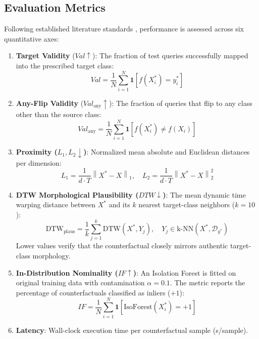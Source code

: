 \documentclass[conference]{IEEEtran}
\newcommand{\norm}[1]{\left\lVert#1\right\rVert}
\begin{document}
\subsection{Evaluation Metrics}
Following established literature standards \cite{kostrzewa2026softdtw, wachter2017counterfactual}, performance is assessed across six quantitative axes:
\begin{enumerate}
    \item \textbf{Target Validity} ($Val \uparrow$): The fraction of test queries successfully mapped into the prescribed target class:
    \begin{equation}
        Val = \frac{1}{N}\sum_{i=1}^N \mathbf{1}\left[ f(X_i^*) = y_i^* \right]
    \end{equation}
    \item \textbf{Any-Flip Validity} ($Val_{\text{any}} \uparrow$): The fraction of queries that flip to any class other than the source class:
    \begin{equation}
        Val_{\text{any}} = \frac{1}{N}\sum_{i=1}^N \mathbf{1}\left[ f(X_i^*) \neq f(X_i) \right]
    \end{equation}
    \item \textbf{Proximity ($L_1, L_2 \downarrow$)}: Normalized mean absolute and Euclidean distances per dimension:
    \begin{equation}
        L_1 = \frac{1}{d \cdot T} \norm{X^* - X}_1, \quad L_2 = \frac{1}{d \cdot T} \norm{X^* - X}_2^2
    \end{equation}
    \item \textbf{DTW Morphological Plausibility ($DTW \downarrow$)}: The mean dynamic time warping distance between $X^*$ and its $k$ nearest target-class neighbors ($k=10$):
    \begin{equation}
        \text{DTW}_{\text{plaus}} = \frac{1}{k}\sum_{j=1}^k \text{DTW}(X^*, Y_j), \quad Y_j \in \text{k-NN}(X^*, \mathcal{D}_{y^*})
    \end{equation}
    Lower values verify that the counterfactual closely mirrors authentic target-class morphology.
    \item \textbf{In-Distribution Nominality ($IF \uparrow$)}: An Isolation Forest is fitted on original training data with contamination $\alpha = 0.1$. The metric reports the percentage of counterfactuals classified as inliers ($+1$):
    \begin{equation}
        IF = \frac{1}{N}\sum_{i=1}^N \mathbf{1}\left[ \text{IsoForest}(X_i^*) = +1 \right]
    \end{equation}
    \item \textbf{Latency}: Wall-clock execution time per counterfactual sample (s/sample).
\end{enumerate}
\end{document}
